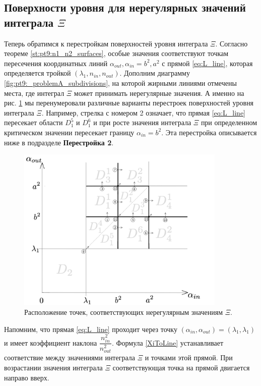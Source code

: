 \subsection{Поверхности уровня для нерегулярных значений интеграла $\Xi$}\label{s2.1.2} 
Теперь обратимся к перестройкам поверхностей уровня интеграла $\Xi$. 
Согласно теореме \ref{st:pt9:n1_n2_surfaces}, особые значения соответствуют точкам пересечения координатных линий $\alpha_{out}, \alpha_{in} = b^2, a^2$ с прямой \eqref{eq:L_line}, которая определяется тройкой $(\lambda_1, n_{in}, n_{out})$.
Дополним диаграмму  \ref{fig:pt9:_problemA_subdivisions}, на которой жирными линиями отмечены места, где интеграл $\Xi$ может принимать нерегулярные значения. А именно на рис. \ref{fig:pt9:_diagramPlusIrregular} мы перенумеровали различные варианты перестроек поверхностей уровня интеграла $\Xi$. 
Например, стрелка с номером 2 означает, что прямая \eqref{eq:L_line} пересекает области $D_1^5$ и $D_1^6$ и при росте значения интеграла $\Xi$ при определенном критическом значении пересекает границу $\alpha_{in} = b^2$. Эта перестройка описывается ниже в подразделе \textbf{Перестройка 2}.

\begin{figure}[!htb]
\centering
\includegraphics[width=10cm]{images/section2/diagramPlusIrregular.pdf}
    \caption{Расположение точек, соответствующих нерегулярным значениям $\Xi$.}
    \label{fig:pt9:_diagramPlusIrregular}
\end{figure}

Напомним, что прямая  \eqref{eq:L_line} проходит через точку $(\alpha_{in}, \alpha_{out}) = (\lambda_1, \lambda_1)$ и имеет коэффициент наклона $\dfrac{n_{in}^2}{n_{out}^2}$. Формула \eqref{XiToLine} устанавливает соответствие между значениями интеграла $\Xi$ и точками этой прямой. При возрастании значения интеграла $\Xi$ соответствующая точка на прямой двигается направо вверх. 

